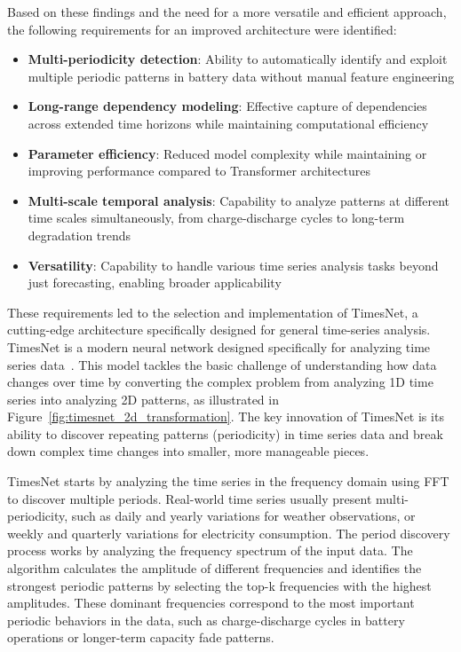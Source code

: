Based on these findings and the need for a more versatile and efficient approach, the following requirements for an improved architecture were identified:

\begin{itemize}
    \item \textbf{Multi-periodicity detection}: Ability to automatically identify and exploit multiple periodic patterns in battery data without manual feature engineering
    \item \textbf{Long-range dependency modeling}: Effective capture of dependencies across extended time horizons while maintaining computational efficiency
    \item \textbf{Parameter efficiency}: Reduced model complexity while maintaining or improving performance compared to Transformer architectures
    \item \textbf{Multi-scale temporal analysis}: Capability to analyze patterns at different time scales simultaneously, from charge-discharge cycles to long-term degradation trends
    \item \textbf{Versatility}: Capability to handle various time series analysis tasks beyond just forecasting, enabling broader applicability
\end{itemize}

These requirements led to the selection and implementation of TimesNet, a cutting-edge architecture specifically designed for general time-series analysis. TimesNet is a modern neural network designed specifically for analyzing time series data~\cite{wu_timesnet_2023}. This model tackles the basic challenge of understanding how data changes over time by converting the complex problem from analyzing 1D time series into analyzing 2D patterns, as illustrated in Figure~\ref{fig:timesnet_2d_transformation}. The key innovation of TimesNet is its ability to discover repeating patterns (periodicity) in time series data and break down complex time changes into smaller, more manageable pieces.


TimesNet starts by analyzing the time series in the frequency domain using FFT to discover multiple periods. Real-world time series usually present multi-periodicity, such as daily and yearly variations for weather observations, or weekly and quarterly variations for electricity consumption. The period discovery process works by analyzing the frequency spectrum of the input data. The algorithm calculates the amplitude of different frequencies and identifies the strongest periodic patterns by selecting the top-k frequencies with the highest amplitudes. These dominant frequencies correspond to the most important periodic behaviors in the data, such as charge-discharge cycles in battery operations or longer-term capacity fade patterns.


